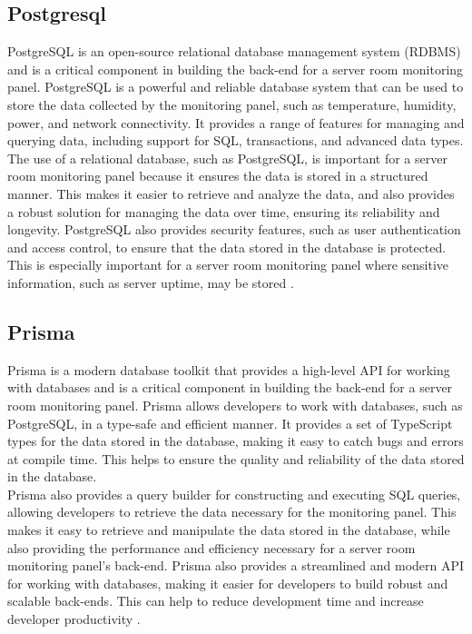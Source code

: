     \subsection{Postgresql}
    PostgreSQL is an open-source relational database management system (RDBMS) and is a critical component in building the back-end for a server room monitoring panel. PostgreSQL is a powerful and reliable database system that can be used to store the data collected by the monitoring panel, such as temperature, humidity, power, and network connectivity. It provides a range of features for managing and querying data, including support for SQL, transactions, and advanced data types.
    The use of a relational database, such as PostgreSQL, is important for a server room monitoring panel because it ensures the data is stored in a structured manner. This makes it easier to retrieve and analyze the data, and also provides a robust solution for managing the data over time, ensuring its reliability and longevity. PostgreSQL also provides security features, such as user authentication and access control, to ensure that the data stored in the database is protected. This is especially important for a server room monitoring panel where sensitive information, such as server uptime, may be stored \cite{postgresql}.
    \subsection{Prisma} 
    Prisma is a modern database toolkit that provides a high-level API for working with databases and is a critical component in building the back-end for a server room monitoring panel. Prisma allows developers to work with databases, such as PostgreSQL, in a type-safe and efficient manner. It provides a set of TypeScript types for the data stored in the database, making it easy to catch bugs and errors at compile time. This helps to ensure the quality and reliability of the data stored in the database.\\
    Prisma also provides a query builder for constructing and executing SQL queries, allowing developers to retrieve the data necessary for the monitoring panel. This makes it easy to retrieve and manipulate the data stored in the database, while also providing the performance and efficiency necessary for a server room monitoring panel's back-end. Prisma also provides a streamlined and modern API for working with databases, making it easier for developers to build robust and scalable back-ends. This can help to reduce development time and increase developer productivity \cite{prisma}.
